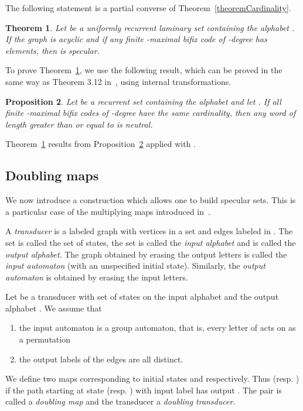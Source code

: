 \documentclass[preprint,12pt]{elsarticle}
\newtheorem{theorem}{Theorem}
\newtheorem{proposition}[theorem]{Proposition}
\numberwithin{theorem}{section}
\numberwithin{equation}{section}
\numberwithin{figure}{section}
\numberwithin{table}{section}
\begin{document}
The following statement is a partial converse of Theorem~\ref{theoremCardinality}. 

\begin{theorem}
\label{theoremConverseCard}
Let  be a uniformly recurrent laminary set containing the alphabet .
If the graph  is acyclic and if any finite -maximal bifix code of -degree  has  elements, then  is specular.
\end{theorem}

To prove Theorem~\ref{theoremConverseCard}, we use the following result, which can be proved in the same way as Theorem 3.12 in~\cite{BertheDeFeliceDolceLeroyPerrinReutenauerRindone2013b}, using internal transformations.

\begin{proposition}
\label{propositionConverseCard}
Let  be a recurrent set containing the alphabet  and let .
If all finite -maximal bifix codes of -degree  have the same cardinality, then any word of length greater than or equal to  is neutral.
\end{proposition}

Theorem~\ref{theoremConverseCard} results from Proposition~\ref{propositionConverseCard} applied with .







\subsection{Doubling maps}
\label{sec:doubling}
We now introduce a construction which allows one to build specular sets.
This is a particular case of the multiplying maps introduced in~\cite{DolcePerrin2016}.

A \emph{transducer} is a labeled graph with vertices
in a set  and edges labeled in . The set  is called the set of states, the set  is called the \emph{input alphabet}
and  is called the \emph{output alphabet}.
The graph obtained by erasing the output
letters is called the \emph{input automaton} (with an unspecified initial state). Similarly, the \emph{output automaton} is obtained by erasing the input letters.

Let  be a transducer with set of states  on the input alphabet
 and the output alphabet . We assume that
\begin{enumerate}
\item the input automaton is a group automaton,
 that is, every
letter of  acts on  as a permutation
\item the output labels of the edges are all distinct.
\end{enumerate}
  We define two maps  corresponding to initial states
 and  respectively. 
Thus  (resp. ) if the path starting at state  (resp. ) with input label  has output .
The pair  is called a \emph{doubling map}
and the transducer  a \emph{doubling transducer}.
\end{document}
